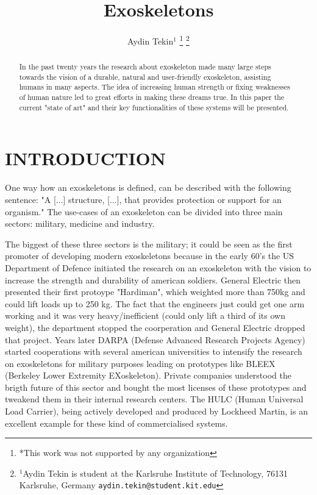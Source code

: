 \documentclass[letterpaper, 10 pt, conference]{ieeeconf}  %
\title{\LARGE \bf
Exoskeletons
}
\author{Aydin Tekin$^{1}$%
\thanks{*This work was not supported by any organization}%
\thanks{$^{1}$Aydin Tekin is student at the Karlsruhe Institute of Technology, 76131 Karlsruhe, Germany
        {\tt\small aydin.tekin@student.kit.edu}}%
}
\begin{document}
\maketitle
\thispagestyle{empty}
\pagestyle{empty}


\begin{abstract}

In the past twenty years the research about exoskeleton made many large steps towards the vision of a durable, natural and user-friendly exoskeleton, assisting humans in many aspects. The idea of increasing human strength or fixing weaknesses of human nature led to great efforts in making these dreams true. In this paper the current "state of art" and their key functionalities of these systems will be presented.

\end{abstract}



\section{INTRODUCTION}

One way how an exoskeletons is defined, can be described with the following sentence:
"A [...] structure, [...], that provides protection or support for an organism."
The use-cases of an exoskeleton can be divided into three main sectors: military, medicine and industry.


The biggest of these three sectors is the military; it could be seen as the first promoter of developing modern exoskeletons because in the early 60's the US Department of Defence initiated the research on an exoskeleton with the vision to increase the strength and durability of american soldiers. General Electric then presented their first protoype "Hardiman", which weighted more than 750kg and could lift loads up to 250 kg. The fact that the engineers just could get one arm working and it was very heavy/inefficient (could only lift a third of its own weight), the department stopped the coorperation and General Electric dropped that project. Years later DARPA (Defense Advanced Research Projects Agency) started cooperations with several american universities to intensify the research on exoskeletons for military purposes leading on prototypes like BLEEX (Berkeley Lower Extremity EXoskeleton). Private companies understood the brigth future of this sector and bought the most licenses of these prototypes and tweakend them in their internal research centers. The HULC (Human Universal Load Carrier), being actively developed and produced by Lockheed Martin, is an excellent example for these kind of commercialised systems.
\end{document}
